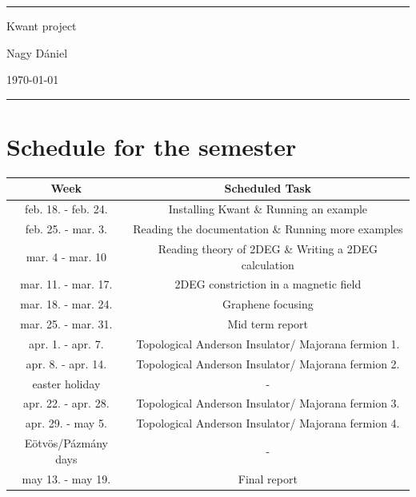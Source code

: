 \documentclass[12pt]{article}
\numberwithin{equation}{section}
\begin{document}
\begin{center}

\thispagestyle{empty}

\rule{10 cm}{2pt}

\vspace{1.5cm}
{ \Large Kwant project}

\vspace{1.0cm}
Nagy Dániel


\vspace{0.5cm}
\today

\vspace{0.25cm}
\rule{10 cm}{2pt}

\end{center}
\newpage

\newpage
{}

\section{Schedule for the semester}

\begin{table}[ht]

  \centering
  \begin{tabular}{|c|c|}
  \hline
  Week & Scheduled Task \\ [0.5ex]  \hline %
  feb. 18. - feb. 24. & Installing Kwant \& Running an example \\ \hline
  feb. 25. - mar. 3. & Reading the documentation \& Running more examples \\ \hline
  mar. 4 - mar. 10 & Reading theory of 2DEG \& Writing a 2DEG calculation \\ \hline 
  mar. 11. - mar. 17. & 2DEG constriction in a magnetic field \\ \hline
  mar. 18. -  mar. 24. & Graphene focusing \\ \hline
  mar. 25. -  mar. 31. & Mid term report \\ \hline
  apr. 1. -  apr. 7. & Topological Anderson Insulator/ Majorana fermion 1. \\ \hline
  apr. 8. -  apr. 14. & Topological Anderson Insulator/ Majorana fermion 2. \\ \hline
  easter holiday & - \\ \hline
  apr. 22. - apr. 28. & Topological Anderson Insulator/ Majorana fermion 3. \\ \hline 
  apr. 29. - may 5. & Topological Anderson Insulator/ Majorana fermion 4. \\ \hline 
  Eötvös/Pázmány days & - \\ \hline
  may 13. - may 19. & Final report \\ \hline

  \end{tabular}
  
\end{table}
\end{document}
